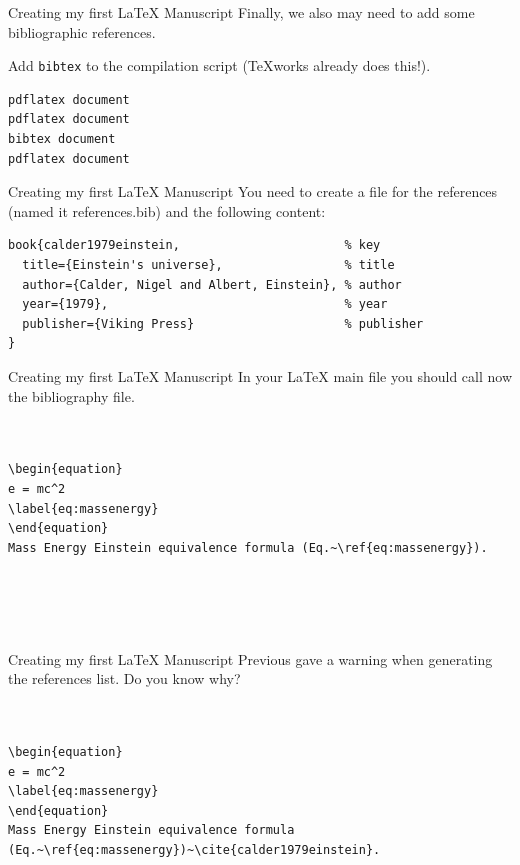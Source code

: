 \begin{frame}[fragile]{Creating my first \LaTeX{} Manuscript}
Finally, we also may need to add some bibliographic references.

Add \verb!bibtex! to the compilation script (TeXworks already does this!).
\scriptsize
\begin{verbatim}
pdflatex document
pdflatex document
bibtex document
pdflatex document
\end{verbatim}
\end{frame}

\begin{frame}[fragile]{Creating my first \LaTeX{} Manuscript}
You need to create a file for the references (named it references.bib) and the following content:
\scriptsize
\begin{verbatim}
book{calder1979einstein,                       % key
  title={Einstein's universe},                 % title
  author={Calder, Nigel and Albert, Einstein}, % author
  year={1979},                                 % year
  publisher={Viking Press}                     % publisher
}
\end{verbatim}
\end{frame}

\begin{frame}[fragile]{Creating my first \LaTeX{} Manuscript}
In your \LaTeX{} main file you should call now the bibliography file.
\scriptsize
\begin{verbatim}


\begin{equation}
e = mc^2
\label{eq:massenergy}
\end{equation}
Mass Energy Einstein equivalence formula (Eq.~\ref{eq:massenergy}).





\end{verbatim}
\end{frame}

\begin{frame}[fragile]{Creating my first \LaTeX{} Manuscript}
Previous gave a warning when generating the references list. Do you know why?
\pause
\scriptsize
\begin{verbatim}


\begin{equation}
e = mc^2
\label{eq:massenergy}
\end{equation}
Mass Energy Einstein equivalence formula 
(Eq.~\ref{eq:massenergy})~\cite{calder1979einstein}.





\end{verbatim}
\end{frame}




